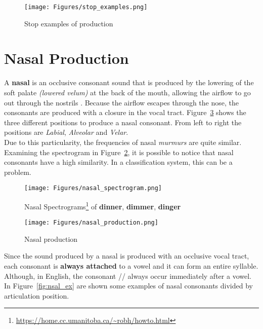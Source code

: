 \begin{figure}[!ht]
    \centering
    \texttt{[image: Figures/stop\_examples.png]}
    \caption{Stop examples of production \cite{mit_phonetics}}
    \label{fig:stop_ex}
\end{figure}


\section{Nasal Production}
\label{sec:Nasal Production}
A \textbf{nasal} is an occlusive consonant sound that is produced by the lowering of the soft palate \textit{(lowered velum)} at the back of the mouth, allowing the airflow to go out through the nostrils \cite{nasal_speech_sound}. Because the airflow escapes through the nose, the consonants are produced with a closure in the vocal tract. Figure~\ref{fig:nasal_prod} shows the three different positions to produce a nasal consonant. From left to right the positions are \textit{Labial}, \textit{Alveolar} and \textit{Velar}. \\
\noindent Due to this particularity, the frequencies of nasal \textit{murmurs} are quite similar. Examining the spectrogram in Figure~\ref{fig:nasal_spectrogram}, it is possible to notice that nasal consonants have a high similarity. In a classification system, this can be a problem.

\begin{figure}[!ht]
    \centering
    \texttt{[image: Figures/nasal\_spectrogram.png]}
    \caption{Nasal Spectrograms\footnote{\url{https://home.cc.umanitoba.ca/~robh/howto.html}} of \textbf{dinner}, \textbf{dimmer}, \textbf{dinger}}
    \label{fig:nasal_spectrogram}
\end{figure}

\begin{figure}[!ht]
    \centering
    \texttt{[image: Figures/nasal\_production.png]}
    \caption{Nasal production \cite{mit_phonetics}}
    \label{fig:nasal_prod}
\end{figure}

\noindent Since the sound produced by a nasal is produced with an occlusive vocal tract, each consonant is \textbf{always attached} to a vowel and it can form an entire syllable\cite{jamesglassvictorzue2003}. Although, in English, the consonant /\textbf{}/ always occur immediately after a vowel. In Figure~\ref{fig:nsal_ex} are shown some examples of nasal consonants divided by articulation position.

